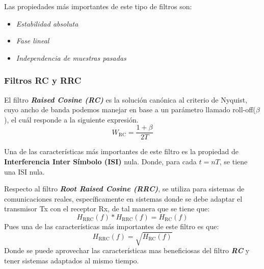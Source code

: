     Las propiedades más importantes de este tipo de filtros son:
    \begin{itemize}
        \item \textit{Estabilidad absoluta}
        \item \textit{Fase lineal}
        \item \textit{Independencia de muestras pasadas}
    \end{itemize}
\subsubsection{Filtros RC y RRC}
    El filtro \textit{\textbf{Raised Cosine (RC)}} es la solución canónica al criterio de Nyquist, cuyo ancho de banda podemos manejar en base
    a un parámetro llamado roll-off($\beta$), el cuál responde a la siguiente expresión.
    \begin{equation}
        W_{\text{RC}} = \frac{1 + \beta}{2T}
        \label{eq:wrc}
    \end{equation}
    
    Una de las características más importantes de este filtro es la propiedad de
    \textbf{Interferencia Inter Símbolo (ISI)} nula. Donde, para cada $t=nT$, se tiene una ISI nula.

    Respecto al filtro \textit{\textbf{Root Raised Cosine (RRC)}}, se utiliza para sistemas de comunicaciones reales, específicamente
    en sistemas donde se debe adaptar el transmisor Tx con el receptor Rx, de tal manera que se tiene que:
    \begin{equation}
        \boxed{H_{\text{RRC}}(f)*H_{\text{RRC}}(f) = H_{\text{RC}}(f)}
    \end{equation}
    Pues una de las características más importantes de este filtro es que:
    \begin{equation}
        H_{\text{RRC}}(f) = \sqrt{H_{\text{RC}}(f)}
    \end{equation}
    Donde se puede aprovechar las características mas beneficiosas del filtro \textit{\textbf{RC}} y tener sistemas adaptados al mismo tiempo.
    
